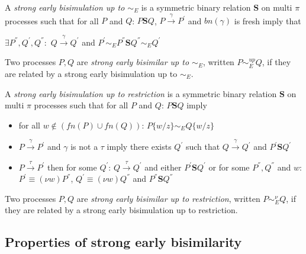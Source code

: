 \begin{definition}\label{strongEarlyBisimulationUpTo}
  A \emph{strong early bisimulation up to $\sim_{E}$} is a symmetric binary relation $\mathbf{S}$ on multi $\pi$ processes such that for all $P$ and $Q$: $P \mathbf{S} Q$, $P \xrightarrow{\gamma} P^{'}$ and $bn(\gamma)$ is fresh imply that
  \begin{center}
    $\exists P^{''},Q^{'},Q^{''}:$ $Q \xrightarrow{\gamma} Q^{'}$ and $P^{'} \sim_{E} P^{''} \mathbf{S} Q^{''} \sim_{E} Q^{'} $
  \end{center}
  Two processes $P,Q$ are \emph{strong early bisimilar up to $\sim_{E}$}, written $P \sim_{E}^{up} Q$, if they are related by a strong early bisimulation up to $\sim_{E}$.
\end{definition}


\begin{definition}\label{strongEarlyBisimulationUpToRestriction}
  A \emph{strong early bisimulation up to restriction} is a symmetric binary relation $\mathbf{S}$ on multi $\pi$ processes such that for all $P$ and $Q$: $P \mathbf{S} Q$ imply
  \begin{itemize}
    \item
      for all $w\notin (fn(P)\cup fn(Q))$: $P\{w/z\} \sim_{E} Q\{w/z\}$
    \item
      $P \xrightarrow{\gamma} P^{'}$ and $\gamma$ is not a $\tau$ imply there exists $Q^{'}$ such that $Q \xrightarrow{\gamma} Q^{'}$ and $P^{'} \mathbf{S} Q^{'}$
    \item
      $P \xrightarrow{\tau} P^{'}$ then for some $Q^{'}$: $Q \xrightarrow{\tau} Q^{'}$ and either $P^{'} \mathbf{S} Q^{'}$ or for some $P^{''},Q^{''}$ and $w$: $P^{'}\equiv (\nu w)P^{''}$, $Q^{'}\equiv (\nu w)Q^{''}$ and $P^{''} \mathbf{S} Q^{''}$
  \end{itemize}
  Two processes $P,Q$ are \emph{strong early bisimilar up to restriction}, written $P \sim_{E}^{\nu} Q$, if they are related by a strong early bisimulation up to restriction.
\end{definition}


\subsection{Properties of strong early bisimilarity}

